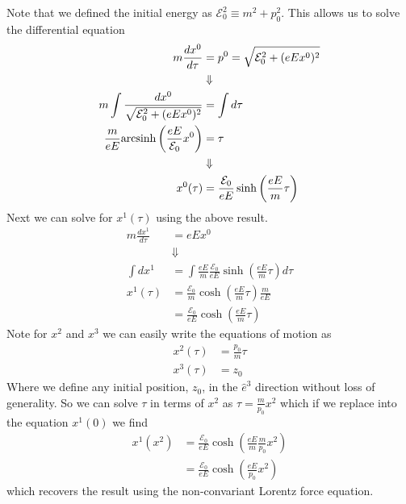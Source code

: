 \documentclass[11pt]{article}
\numberwithin{equation}{section}
\begin{document}
    Note that we defined the initial energy as $\mathcal{E}_0^2\equiv m^2+p_0^2$. This allows us to solve the 
    differential equation
    \begin{align*}
        m\frac{dx^{0}}{d\tau} &= p^{0} = \sqrt{\mathcal{E}_0^2 + (eEx^{0})^2}\\
                              &\Downarrow\\
        m\int\frac{dx^{0}}{\sqrt{\mathcal{E}_0^2 + (eEx^{0})^2}} &= \int d\tau \\
        \frac{m}{eE}\textnormal{arcsinh}\left(\frac{eE}{\mathcal{E}_0}x^{0}\right) &= \tau\\
                              &\Downarrow\\
        x^{0}(\tau) &= \frac{\mathcal{E}_0}{eE}\sinh\left(\frac{eE}{m}\tau\right)
    \end{align*}
    Next we can solve for $x^{1}(\tau)$ using the above result. 
    \begin{align*}
        m\frac{dx^{1}}{d\tau}  &= eEx^{0} \\
                               &\Downarrow\\
        \int dx^{1}  &= \int\frac{eE}{m}\frac{\mathcal{E}_0}{eE}\sinh\left(\frac{eE}{m}\tau\right)d\tau\\
        x^{1}(\tau)  &= \frac{\mathcal{E}_0}{m}\cosh\left(\frac{eE}{m}\tau\right)\frac{m}{eE}\\
                     &= \frac{\mathcal{E}_0}{eE}\cosh\left(\frac{eE}{m}\tau\right)
    \end{align*}
    Note for $x^{2}$ and $x^{3}$ we can easily write the equations of motion as
    \begin{align*}
        x^{2}(\tau) &= \frac{p_0}{m}\tau\\
        x^{3}(\tau) &= z_0
    \end{align*}
    Where we define any initial position, $z_0$, in the $\hat{e}^3$ direction without loss of generality. So we can solve
    $\tau$ in terms of $x^{2}$ as $\tau = \frac{m}{p_0}x^{2}$ which if we replace into the equation $x^{1}(0)$ we
    find
    \begin{align*}
        x^{1}(x^{2}) &= \frac{\mathcal{E}_0}{eE}\cosh\left(\frac{eE}{m}\frac{m}{p_0}x^{2}\right)\\
                     &= \frac{\mathcal{E}_0}{eE}\cosh\left(\frac{eE}{p_0}x^{2}\right)
    \end{align*}
    which recovers the result using the non-convariant Lorentz force equation.
\end{document}
